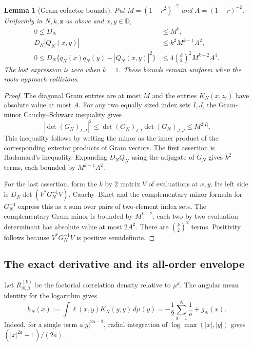 \documentclass[11pt]{article}
\newtheorem{lemma}[theorem]{Lemma}
\theoremstyle{remark}\newtheorem{remark}[theorem]{Remark}
\begin{document}
\begin{lemma}[Gram cofactor bounds]\label{lem:cofactor-linear-response}
Put $M=(1-r^2)^{-2}$ and $A=(1-r)^{-2}$. Uniformly in $N,k,\mathbf z$
as above and $x,y\in\mathbb D$,
\begin{align*}
 0\le D_N&\le M^k,\\
 D_N|Q_N(x,y)|&\le k^2M^{k-1}A^2,\\
 0\le D_N\{q_N(x)q_N(y)-|Q_N(x,y)|^2\}
       &\le4\binom{k}{2}^2M^{k-2}A^4.
\end{align*}
The last expression is zero when $k=1$. These bounds remain uniform when
the roots approach collisions.
\end{lemma}
\begin{proof}
The diagonal Gram entries are at most $M$ and the entries
$K_N(x,z_i)$ have absolute value at most $A$. For any two equally sized
index sets $I,J$, the Gram-minor Cauchy--Schwarz inequality gives
\[
 |\det(G_N)_{I,J}|^2
 \le\det(G_N)_{I,I}\det(G_N)_{J,J}\le M^{2|I|}.
\]
This inequality follows by writing the minor as the inner product of the
corresponding exterior products of Gram vectors. The first assertion is
Hadamard's inequality. Expanding $D_NQ_N$ using the adjugate of $G_N$
gives $k^2$ terms, each bounded by $M^{k-1}A^2$.

For the last assertion, form the $k$ by $2$ matrix $V$ of evaluations at
$x,y$. Its left side is $D_N\det(V^*G_N^{-1}V)$. Cauchy--Binet and
the complementary-minor formula for $G_N^{-1}$ express this as a sum
over pairs of two-element index sets. The complementary Gram minor is
bounded by $M^{k-2}$; each two by two evaluation determinant has absolute
value at most $2A^2$. There are $\binom{k}{2}^2$ terms. Positivity follows
because $V^*G_N^{-1}V$ is positive semidefinite.
\end{proof}

\subsection{The exact derivative and its all-order envelope}
Let $R_{N,\beta}^{(k)}$ be the factorial correlation density relative to
$\mu^k$. The angular mean identity for the logarithm gives
\begin{equation}\label{eq:response-h-potential}
 h_N(x):=\int\ell(x,y)K_N(y,y)\,d\mu(y)
   =-\frac12\sum_{a=1}^N\frac1a+g_N(x).
\end{equation}
Indeed, for a single term $a|y|^{2a-2}$, radial integration of
$\log\max(|x|,|y|)$ gives $(|x|^{2a}-1)/(2a)$.
\end{document}
